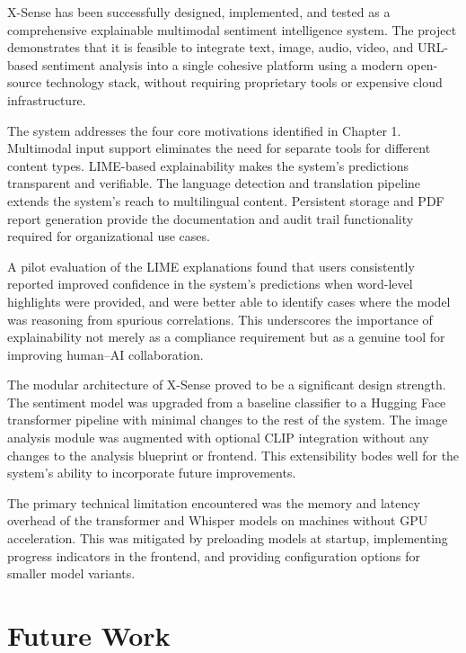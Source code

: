 \documentclass[12pt, a4paper]{report}
\begin{document}
X-Sense has been successfully designed, implemented, and tested as a comprehensive explainable multimodal sentiment intelligence system. The project demonstrates that it is feasible to integrate text, image, audio, video, and URL-based sentiment analysis into a single cohesive platform using a modern open-source technology stack, without requiring proprietary tools or expensive cloud infrastructure.

The system addresses the four core motivations identified in Chapter 1. Multimodal input support eliminates the need for separate tools for different content types. LIME-based explainability makes the system's predictions transparent and verifiable. The language detection and translation pipeline extends the system's reach to multilingual content. Persistent storage and PDF report generation provide the documentation and audit trail functionality required for organizational use cases.

A pilot evaluation of the LIME explanations found that users consistently reported improved confidence in the system's predictions when word-level highlights were provided, and were better able to identify cases where the model was reasoning from spurious correlations. This underscores the importance of explainability not merely as a compliance requirement but as a genuine tool for improving human--AI collaboration.

The modular architecture of X-Sense proved to be a significant design strength. The sentiment model was upgraded from a baseline classifier to a Hugging Face transformer pipeline with minimal changes to the rest of the system. The image analysis module was augmented with optional CLIP integration without any changes to the analysis blueprint or frontend. This extensibility bodes well for the system's ability to incorporate future improvements.

The primary technical limitation encountered was the memory and latency overhead of the transformer and Whisper models on machines without GPU acceleration. This was mitigated by preloading models at startup, implementing progress indicators in the frontend, and providing configuration options for smaller model variants.

\section{Future Work}
\end{document}
